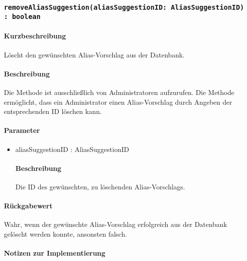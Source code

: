 \subsubsection{\texttt{removeAliasSuggestion(aliasSuggestionID: AliasSuggestionID) : boolean}}%
\paragraph*{Kurzbeschreibung}
Löscht den gewünschten Alias-Vorschlag aus der Datenbank.
\paragraph*{Beschreibung}
Die Methode ist ausschließlich von Administratoren aufzurufen.
Die Methode ermöglicht, dass ein Administrator einen Alias-Vorschlag durch Angeben der entsprechenden ID löschen kann.
\paragraph*{Parameter}
\begin{itemize}
	\item aliasSuggestionID : AliasSuggestionID
		\paragraph*{Beschreibung}
		Die ID des gewünschten, zu löschenden Alias-Vorschlags.
\end{itemize}
\paragraph*{Rückgabewert}
Wahr, wenn der gewünschte Alias-Vorschlag erfolgreich aus der Datenbank gelöscht werden konnte, ansonsten falsch.

\paragraph*{Notizen zur Implementierung}%
